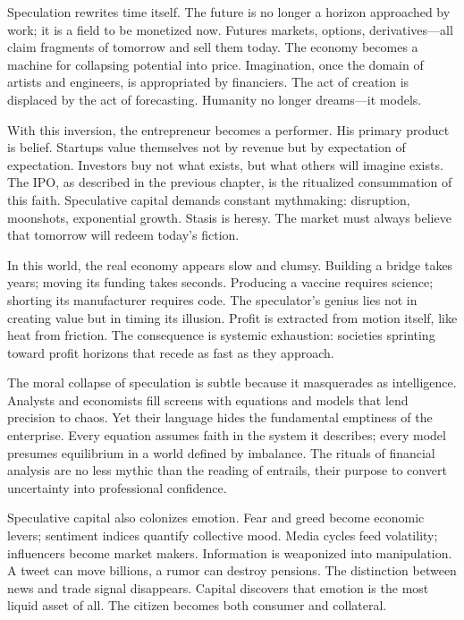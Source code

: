 \documentclass[11pt,twoside]{book}
\begin{document}
Speculation rewrites time itself.  The future is no longer a horizon approached by work; it is a field to be monetized now.  Futures markets, options, derivatives—all claim fragments of tomorrow and sell them today.  The economy becomes a machine for collapsing potential into price.  Imagination, once the domain of artists and engineers, is appropriated by financiers.  The act of creation is displaced by the act of forecasting.  Humanity no longer dreams—it models.

With this inversion, the entrepreneur becomes a performer.  His primary product is belief.  Startups value themselves not by revenue but by expectation of expectation.  Investors buy not what exists, but what others will imagine exists.  The IPO, as described in the previous chapter, is the ritualized consummation of this faith.  Speculative capital demands constant mythmaking: disruption, moonshots, exponential growth.  Stasis is heresy.  The market must always believe that tomorrow will redeem today’s fiction.

In this world, the real economy appears slow and clumsy.  Building a bridge takes years; moving its funding takes seconds.  Producing a vaccine requires science; shorting its manufacturer requires code.  The speculator’s genius lies not in creating value but in timing its illusion.  Profit is extracted from motion itself, like heat from friction.  The consequence is systemic exhaustion: societies sprinting toward profit horizons that recede as fast as they approach.

The moral collapse of speculation is subtle because it masquerades as intelligence.  Analysts and economists fill screens with equations and models that lend precision to chaos.  Yet their language hides the fundamental emptiness of the enterprise.  Every equation assumes faith in the system it describes; every model presumes equilibrium in a world defined by imbalance.  The rituals of financial analysis are no less mythic than the reading of entrails, their purpose to convert uncertainty into professional confidence.

Speculative capital also colonizes emotion.  Fear and greed become economic levers; sentiment indices quantify collective mood.  Media cycles feed volatility; influencers become market makers.  Information is weaponized into manipulation.  A tweet can move billions, a rumor can destroy pensions.  The distinction between news and trade signal disappears.  Capital discovers that emotion is the most liquid asset of all.  The citizen becomes both consumer and collateral.
\end{document}
